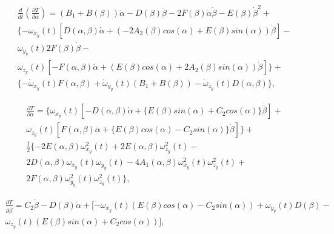 \begin{equation}%
\label{eq:p3:42+}
\begin{multlined}
\frac{d}{d t}\left( \frac{ \partial T}{ \partial \dot \alpha}\right) = 
(B_1 + B(\beta)) \ddot{\alpha} - 
D(\beta) \ddot{\beta} - 
2F(\beta)\dot{\alpha}\dot{\beta} - 
E(\beta)\dot{\beta}^2 
+
\\
\{ 
	-\omega_{x_y} (t) \left[ D(\alpha, \beta)\dot{\alpha} + (-2A_2(\beta)cos(\alpha)+E(\beta)sin(\alpha))\dot{\beta} \right] -\\
	\omega_{y_y} (t) 2F(\beta)\dot{\beta}-\\
	\omega_{z_y} (t) 
	\left[ 
		-F(\alpha, \beta)\dot{\alpha} + 
		(
			E(\beta)cos(\alpha) + 
			2A_2(\beta)sin(\alpha)
		) 
		\dot{\beta} 
	\right]
\}
+\\
\{
	-\dot{\omega}_{x_y} (t) F(\alpha, \beta)
	+\dot{\omega}_{y_y} (t) (B_1 + B(\beta))
	-\dot{\omega}_{z_y} (t) D(\alpha, \beta)
\}
,
\end{multlined}
\end{equation}


\begin{equation}%
\label{eq:p3:43}
\begin{multlined}
\frac{ \partial T}{ \partial \alpha}=
\{
	\omega_{x_y} (t) 
	\left[ 
		-D(\alpha, \beta)\dot{\alpha}
		+
		\{
			E(\beta) sin(\alpha) +
			C_2 cos(\alpha)
		\} \dot{\beta}
	\right] +\\
	\omega_{z_y} (t)
	\left[ 
		F(\alpha, \beta)\dot{\alpha}
		+
		\{
		E(\beta) cos(\alpha) -
		C_2 sin(\alpha)
		\} \dot{\beta}
	\right] 
\}
 +\\
\frac{1}{2}
\{
 	-2E(\alpha, \beta)\omega^2_{x_y}(t) +
 	2E(\alpha, \beta)\omega^2_{z_y}(t)-\\
 	2D(\alpha, \beta)\omega_{x_y} (t) \omega_{y_y} (t)-
 	4A_1(\alpha, \beta)\omega^2_{x_y}(t) \omega^2_{z_y}(t) +\\
 	2F(\alpha, \beta)\omega^2_{y_y}(t) \omega^2_{z_y}(t)
\} 
,
\end{multlined}
\end{equation}


\begin{equation}%
\label{eq:p3:44}
\begin{multlined}
\frac{ \partial T}{ \partial \dot \beta}= 
C_2 \dot{\beta} - D(\beta)\dot{\alpha} + 
[ 
	-\omega_{x_y} (t) (E(\beta)cos(\alpha) - C_2 sin(\alpha))
	+\omega_{y_y} (t) D(\beta) - \\
	\omega_{z_y} (t) (E(\beta)sin(\alpha) + C_2 cos(\alpha))
],
\end{multlined}
\end{equation}

